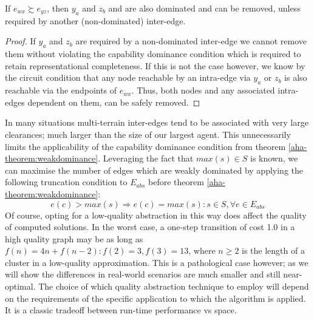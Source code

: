 \begin{corollary}
If $e_{wx} \succsim e_{yz}$, then $y_{a}$ and $z_{b}$ and are also dominated and can be removed, unless required by another (non-dominated) inter-edge. 
\end{corollary}
\begin{proof}
If $y_{a}$ and $z_{b}$ are required by a non-dominated inter-edge we cannot remove them without violating the capability dominance condition which is required to retain representational completeness. 
If this is not the case however, we know by the circuit condition that any node reachable by an intra-edge via $y_{a}$ or $z_{b}$ is also reachable via the endpoints of $e_{wx}$. 
Thus, both nodes and any associated intra-edges dependent on them, can be safely removed.
\end{proof}
In many situations multi-terrain inter-edges tend to be associated with very large clearances; much larger than the size of our largest agent.
This unnecessarily limits the applicability of the capability dominance condition from theorem \ref{aha-theorem:weakdominance}. 
Leveraging the fact that $max(s) \in S$ is known, we can maximise the number of edges which are weakly dominated by applying the following truncation condition to $E_{abs}$ before theorem \ref{aha-theorem:weakdominance}:
$$
e(c) > max(s) \Rightarrow e(c) = max(s) : s \in S, \forall e \in E_{abs}
$$
Of course, opting for a low-quality abstraction in this way does affect the quality of computed solutions. 
In the worst case, a one-step transition of cost 1.0 in a high quality graph may be as long as $f(n) = 4n + f(n-2) : f(2) = 3, f(3) = 13$, where $n \geq 2$ is the length of a cluster in a low-quality approximation.
This is a pathological case however; as we will show the differences in real-world scenarios are much smaller and still near-optimal. 
The choice of which quality abstraction technique to employ will depend on the requirements of the specific application to which the algorithm is applied.
It is a classic tradeoff between run-time performance vs space.
